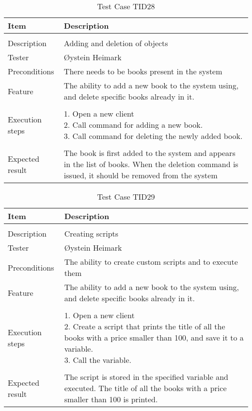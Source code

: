 \begin{table}[H]
\caption{Test Case TID28}
\centering
\begin{tabular}{ l p{13cm} }
\hline 
 Item            & Description        \\ 
\hline \\ [-2.0ex]
 Description     & Adding and deletion of objects \\ 
 Tester          & Øystein Heimark                  \\ 
 Preconditions   & There needs to be books present in the system\\ 
 Feature         & The ability to add a new book to the system using, and delete specific books already in it.   \vspace{3pt}                     \\ 
\hline \\ [-1.5ex]
 Execution steps & \pbox{13cm}{1. Open a new client \\ 2. Call command for adding a new book. \\ 3. Call command for deleting the newly added book.} \vspace{3pt} \\
\hline \\ [-1.5ex]
 Expected result & The book is first added to the system and appears in the list of books. When the deletion command is issued, it should be removed from the system \\
\hline 
\end{tabular}
\label{table:testcasetid28}
\end{table}

\begin{table}[H]
\caption{Test Case TID29}
\centering
\begin{tabular}{ l p{13cm} }
\hline 
 Item            & Description        \\ 
\hline \\ [-2.0ex]
 Description     & Creating scripts \\ 
 Tester          & Øystein Heimark                  \\ 
 Preconditions   & The ability to create custom scripts and to execute them\\ 
 Feature         & The ability to add a new book to the system using, and delete specific books already in it.   \vspace{3pt}                     \\ 
\hline \\ [-1.5ex]
 Execution steps & \pbox{13cm}{1. Open a new client \\ 2. Create a script that prints the title of all the books with a price smaller than 100, and save it to a variable. \\ 3. Call the variable.} \vspace{3pt} \\
\hline \\ [-1.5ex]
Expected result & The script is stored in the specified variable and executed. The title of all the books with a price smaller than 100 is printed. \\
\hline 
\end{tabular}
\label{table:testcasetid29}
\end{table}

